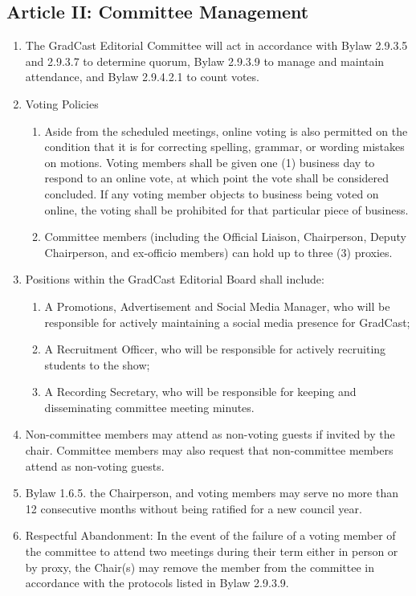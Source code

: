 \subsection{Article II: Committee Management}
\begin{enumerate}[label*=\arabic*., align=left]
\item The GradCast Editorial Committee will act in accordance with Bylaw 2.9.3.5 and 2.9.3.7 to determine quorum, Bylaw 2.9.3.9 to manage and maintain attendance, and Bylaw 2.9.4.2.1 to count votes.
\item Voting Policies
\begin{enumerate}[label*=\arabic*., align=left]	
\item Aside from the scheduled meetings, online voting is also permitted on the condition that it is for correcting spelling, grammar, or wording mistakes on motions. Voting members shall be given one (1) business day to respond to an online vote, at which point the vote shall be considered concluded. If any voting member objects to business being voted on online, the voting shall be prohibited for that particular piece of business.
\item Committee members (including the Official Liaison, Chairperson, Deputy Chairperson, and ex-officio members) can hold up to three (3) proxies.
\end{enumerate}
\item Positions within the GradCast Editorial Board shall include:
\begin{enumerate}[label*=\arabic*., align=left]
\item A Promotions, Advertisement and Social Media Manager, who will be responsible for actively maintaining a social media presence for GradCast;
\item A Recruitment Officer, who will be responsible for actively recruiting students to the show;
\item A Recording Secretary, who will be responsible for keeping and disseminating committee meeting minutes.
\end{enumerate}
\item Non-committee members may attend as non-voting guests if invited by the chair. Committee members may also request that non-committee members attend as non-voting guests.
\item Bylaw 1.6.5. the Chairperson, and voting members may serve no more than 12 consecutive months without being ratified for a new council year.
\item Respectful Abandonment: In the event of the failure of a voting member of the committee to attend two meetings during their term either in person or by proxy, the Chair(s) may remove the member from the committee in accordance with the protocols listed in Bylaw 2.9.3.9.
\end{enumerate}

